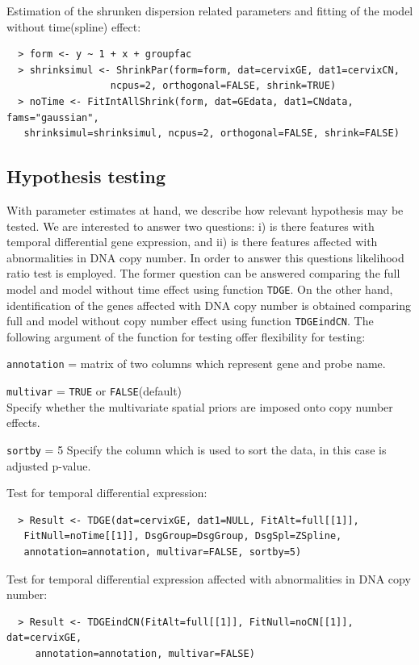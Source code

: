 \documentclass[a4paper]{article}
\begin{document}
Estimation of the shrunken dispersion related parameters and fitting of the model without time(spline) effect:
\begin{verbatim}
  > form <- y ~ 1 + x + groupfac 
  > shrinksimul <- ShrinkPar(form=form, dat=cervixGE, dat1=cervixCN,
                  ncpus=2, orthogonal=FALSE, shrink=TRUE)
  > noTime <- FitIntAllShrink(form, dat=GEdata, dat1=CNdata, fams="gaussian",
   shrinksimul=shrinksimul, ncpus=2, orthogonal=FALSE, shrink=FALSE)
\end{verbatim}

\subsection{Hypothesis testing}

With parameter estimates at hand, we describe how relevant hypothesis may be tested. We are interested to answer two questions: i) is there features with temporal differential gene expression, and ii) is there features affected with abnormalities in DNA copy number. In order to answer this questions likelihood ratio test is employed. The former question can be answered comparing the full model and model without time effect using function {\tt TDGE}. On the other hand, identification of the genes affected with DNA copy number is obtained comparing full and model without copy number effect using function {\tt TDGEindCN}.
The following argument of the function for testing offer flexibility for testing:
\begin{compactitem}
\item {\tt annotation} = matrix of two columns which represent gene and probe name. 
\item {\tt multivar} = {\tt TRUE} or {\tt FALSE}(default)\\
 Specify whether the multivariate spatial priors are imposed onto copy number effects.
\item {\tt sortby} = 5 
Specify the column which is used to sort the data, in this case is adjusted p-value. 
\end{compactitem}
Test for temporal differential expression:
\begin{verbatim}
  > Result <- TDGE(dat=cervixGE, dat1=NULL, FitAlt=full[[1]], 
   FitNull=noTime[[1]], DsgGroup=DsgGroup, DsgSpl=ZSpline,
   annotation=annotation, multivar=FALSE, sortby=5)
\end{verbatim}
Test for temporal differential expression affected with abnormalities in DNA copy number:
\begin{verbatim}
  > Result <- TDGEindCN(FitAlt=full[[1]], FitNull=noCN[[1]], dat=cervixGE, 
     annotation=annotation, multivar=FALSE)
\end{verbatim}
\end{document}
